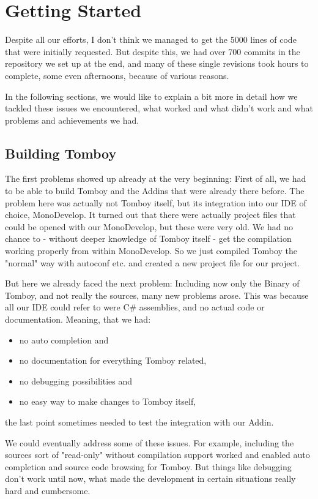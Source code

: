 \section{Getting Started} \label{beginning}

Despite all our efforts, I don't think we managed to get the 5000 lines of code that were initially requested. But despite this, we had over 700 commits in the repository we set up at the end, and many of these single revisions took hours to complete, some even afternoons, because of various reasons.

In the following sections, we would like to explain a bit more in detail how we tackled these issues we encountered, what worked and what didn't work and what problems and achievements we had.

\subsection{Building Tomboy}
\label{building_tomboy}
The first problems showed up already at the very beginning: First of all, we had to be able to build Tomboy and the Addins that were already there before. The problem here was actually not Tomboy itself, but its integration into our IDE of choice, MonoDevelop. It turned out that there were actually project files that could be opened with our MonoDevelop, but these were very old. We had no chance to - without deeper knowledge of Tomboy itself - get the compilation working properly from within MonoDevelop. So we just compiled Tomboy the "normal" way with autoconf etc. and created a new project file for our project.

But here we already faced the next problem: Including now only the Binary of Tomboy, and not really the sources, many new problems arose. This was because all our IDE could refer to were C\# assemblies, and no actual code or documentation. Meaning, that we had:
\begin{itemize}
\item no auto completion and
\item no documentation for everything Tomboy related,
\item no debugging possibilities and
\item no easy way to make changes to Tomboy itself,
\end{itemize}
the last point sometimes needed to test the integration with our Addin.

We could eventually address some of these issues. For example, including the sources sort of "read-only" without compilation support worked and enabled auto completion and source code browsing for Tomboy. But things like debugging don't work until now, what made the development in certain situations really hard and cumbersome.

